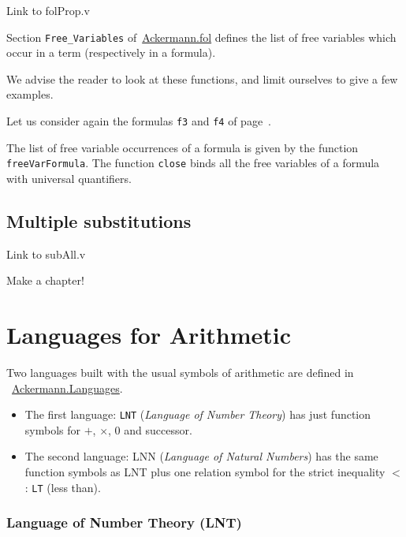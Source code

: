 \begin{todo}
Link to folProp.v
\end{todo}


 
Section \texttt{Free\_Variables} 
of~\href{../theories/html/hydras.Ackermann.fol.html}{Ackermann.fol} defines the list of free variables which occur in a term (respectively in a formula).

We advise the reader to look at these functions, and limit ourselves to give a few examples.

Let us consider again the formulas \texttt{f3} and \texttt{f4} of page~\pageref{fol:examplesf1f2f3}.

The list of free variable occurrences of a formula is given by the function \texttt{freeVarFormula}. The function \texttt{close}
binds all the free variables of a formula with universal quantifiers.


\subsection{Multiple substitutions}

\begin{todo}
Link to subAll.v
\end{todo}

\begin{todo}
Make a chapter!
\end{todo}
\section{Languages for Arithmetic}



Two languages built with the usual symbols of arithmetic are 
defined in ~\href{../theories/html/hydras.Ackermann.Languages.html}{Ackermann.Languages}.

\begin{itemize}
\item The first language: \texttt{LNT} (\emph{Language of Number Theory}) has just function symbols for $+$, $\times$, $0$ and successor.
\item The second language: LNN (\emph{Language of Natural Numbers})  has
the same function symbols as LNT plus one relation symbol for the strict inequality $<$ : \texttt{LT} (less than).
\end{itemize}

\subsubsection{Language of Number Theory (LNT)}

